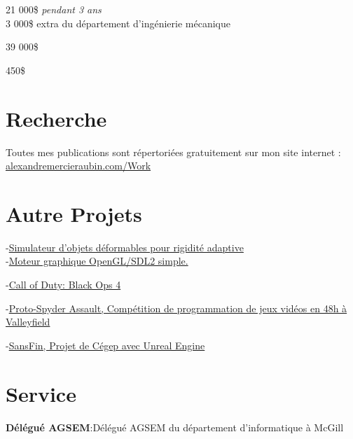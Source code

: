 \documentclass[10pt]{article} %
\begin{document}
{
 21 000\$ \textit{pendant 3 ans} \\
 3 000\$ extra du département d'ingénierie mécanique\\
}

{
\textit{} 39 000\$\\
}


{
\textit{} 450\$\\
}

\section{Recherche}
Toutes mes publications sont répertoriées gratuitement sur mon site internet : \href{https://alexandremercieraubin.com/Work}{alexandremercieraubin.com/Work}


\section{Autre Projets}

{
-\href{https://github.com/AlexandreMercierAubin/AdaptiveRigidification2022}{Simulateur d'objets déformables pour rigidité adaptive}\\
-\href{https://github.com/AlexandreMercierAubin/ComputerGraphics}{Moteur graphique OpenGL/SDL2 simple.}\\

}

{
-\href{https://www.callofduty.com/ca/en/blackops4}{Call of Duty: Black Ops 4}

-\href{https://youtu.be/qJjy8b0kuSY}{Proto-Spyder Assault, Compétition de programmation de jeux vidéos en 48h à Valleyfield}

-\href{https://youtu.be/s6vr07Nt1IY}{SansFin, Projet de Cégep avec Unreal Engine}
}

\section{Service}
\textbf{Délégué AGSEM}:Délégué AGSEM du département d'informatique à McGill
\end{document}
